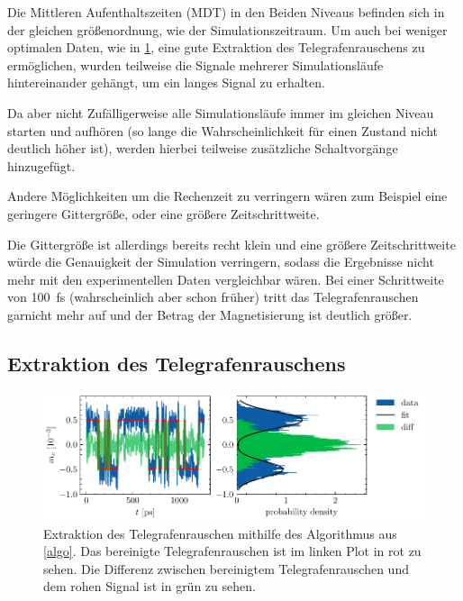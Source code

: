 \documentclass[main.tex]{subfiles}
\begin{document}


Die Mittleren Aufenthaltszeiten (MDT) in den Beiden Niveaus befinden sich in der gleichen größenordnung, wie der Simulationszeitraum. Um auch bei weniger optimalen Daten, wie in \cref{fig:extraktion-tgr}, eine gute Extraktion des Telegrafenrauschens zu ermöglichen, wurden teilweise die Signale mehrerer Simulationsläufe hintereinander gehängt, um ein langes Signal zu erhalten.

Da aber nicht Zufälligerweise alle Simulationsläufe immer im gleichen Niveau starten und aufhören (so lange die Wahrscheinlichkeit für einen Zustand nicht deutlich höher ist), werden hierbei teilweise zusätzliche Schaltvorgänge hinzugefügt.


Andere Möglichkeiten um die Rechenzeit zu verringern wären zum Beispiel eine geringere Gittergröße, oder eine größere Zeitschrittweite.

Die Gittergröße ist allerdings bereits recht klein und eine größere Zeitschrittweite würde die Genauigkeit der Simulation verringern, sodass die Ergebnisse nicht mehr mit den experimentellen Daten vergleichbar wären. Bei einer Schrittweite von \SI{100}{\femto\second} (wahrscheinlich aber schon früher) tritt das Telegrafenrauschen garnicht mehr auf und der Betrag der Magnetisierung ist deutlich größer.




\subsection{Extraktion des Telegrafenrauschens}

\begin{figure}[H]
    \centering
    \includegraphics{bilder/plots/Bz_0mT/mc_fit_hist_part2_26.03meV.pdf}
    \caption{Extraktion des Telegrafenrauschen mithilfe des Algorithmus aus \cref{algo}. Das bereinigte Telegrafenrauschen ist im linken Plot in rot zu sehen. Die Differenz zwischen bereinigtem Telegrafenrauschen und dem rohen Signal ist in grün zu sehen.}\label{fig:extraktion-tgr}
\end{figure}
\end{document}

